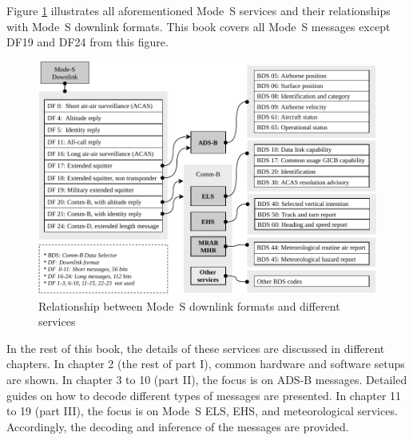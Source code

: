 Figure \ref{fig:mode_s_services} illustrates all aforementioned Mode~S services and their relationships with Mode~S downlink formats. This book covers all Mode~S messages except DF19 and DF24 from this figure.

\begin{figure}[ht]
  \centering
  \includegraphics[width=\textwidth]{figures/intro/mode_s_services.pdf}
  \caption{Relationship between Mode~S downlink formats and different services}
  \label{fig:mode_s_services}
\end{figure}

In the rest of this book, the details of these services are discussed in different chapters. In chapter 2 (the rest of part I), common hardware and software setups are shown. In chapter 3 to 10 (part II), the focus is on ADS-B messages. Detailed guides on how to decode different types of messages are presented. In chapter 11 to 19 (part III), the focus is on Mode~S ELS, EHS, and meteorological services. Accordingly, the decoding and inference of the messages are provided.
